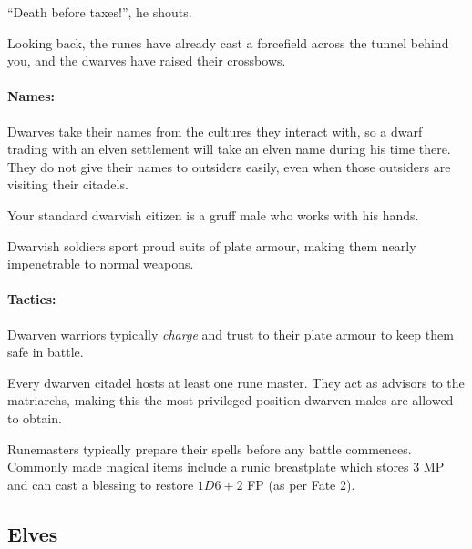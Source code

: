 \begin{multicols}{2}
\begin{boxtext}
  ``Death before taxes!'', he shouts.

  Looking back, the runes have already cast a forcefield across the tunnel behind you, and the dwarves have raised their crossbows.

\end{boxtext}

\paragraph{Names:}
Dwarves take their names from the cultures they interact with, so a dwarf trading with an elven settlement will take an elven name during his time there.
They do not give their names to outsiders easily, even when those outsiders are visiting their citadels.

\label{dwarven_trader}

Your standard dwarvish citizen is a gruff male who works with his hands.

\dwarventrader

\label{dwarven_soldier}

Dwarvish soldiers sport proud suits of plate armour, making them nearly impenetrable to normal weapons.


\paragraph{Tactics:} Dwarven  warriors typically \textit{charge} and trust to their plate armour to keep them safe in battle.%

\label{dwarven_runemaster}

Every dwarven citadel hosts at least one rune master.  They act as advisors to the matriarchs, making this the most privileged position dwarven males are allowed to obtain.

\dwarvenrunemaster

Runemasters typically prepare their spells before any battle commences.
Commonly made magical items include a runic breastplate which stores 3 MP and can cast  a blessing to restore $1D6+2$ FP (as per Fate 2).

\subsection{Elves}

\begin{boxtext}


\end{boxtext}
\end{multicols}
